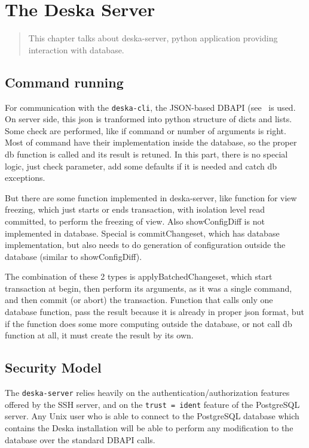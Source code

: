 \documentclass[deska]{subfiles}
\begin{document}
\chapter{The Deska Server}
\label{sec:server-py}

\begin{abstract}
This chapter talks about deska-server, python application providing interaction with database.
\end{abstract}


\section{Command running}
For communication with the {\tt deska-cli}, the JSON-based DBAPI (see~ is used. On server side, this json is tranformed into python structure of dicts and lists. Some check are performed, like if command or number of arguments is right.
Most of command have their implementation inside the database, so the proper db function is called and its result is retuned. In this part, there is no special logic, just check parameter, add some defaults if it is needed and catch db exceptions.

But there are some function implemented in deska-server, like function for view freezing, which just starts or ends transaction, with isolation
level read committed, to perform the freezing of view.
Also showConfigDiff is not implemented in database. Special is commitChangeset, which has database implementation, but also needs to do generation of configuration outside the database (similar to showConfigDiff).

The combination of these 2 types is applyBatchedChangeset, which start transaction at begin, then perform its arguments, as it was a single
command, and then commit (or abort) the transaction. 
Function that calls only one database function, pass the result because it is already in proper json format, but if the function does some
more computing outside the database, or not call db function at all, it must create the result by its own.

\section{Security Model}
\label{sec:server-security-model}

The {\tt deska-server} relies heavily on the authentication/authorization features offered by the SSH server, and on the
{\tt trust = ident} feature of the PostgreSQL server.  Any Unix user who is able to connect to the PostgreSQL database
which contains the Deska installation will be able to perform any modification to the database over the standard DBAPI
calls.

\end{document}
